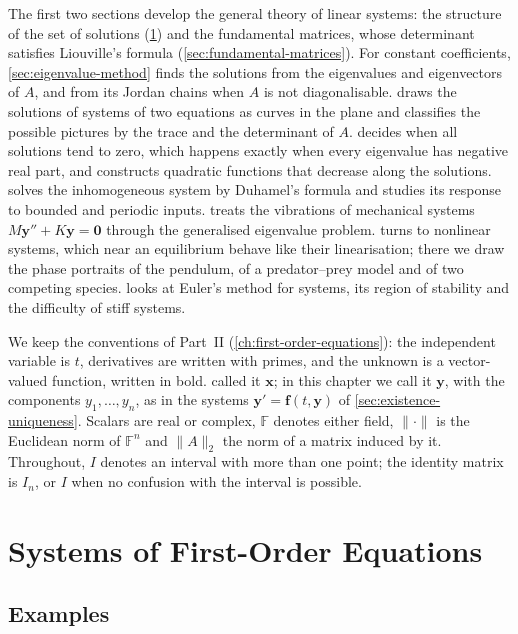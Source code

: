 The first two sections develop the general theory of linear systems: the structure of the set of solutions (\cref{sec:ode-systems}) and the fundamental matrices, whose determinant satisfies Liouville's formula (\cref{sec:fundamental-matrices}). For constant coefficients, \cref{sec:eigenvalue-method} finds the solutions from the eigenvalues and eigenvectors of $A$, and from its Jordan chains when $A$ is not diagonalisable.  draws the solutions of systems of two equations as curves in the plane and classifies the possible pictures by the trace and the determinant of $A$.  decides when all solutions tend to zero, which happens exactly when every eigenvalue has negative real part, and constructs quadratic functions that decrease along the solutions.  solves the inhomogeneous system by Duhamel's formula and studies its response to bounded and periodic inputs.  treats the vibrations of mechanical systems $M\mathbf y''+K\mathbf y=\mathbf 0$ through the generalised eigenvalue problem.  turns to nonlinear systems, which near an equilibrium behave like their linearisation; there we draw the phase portraits of the pendulum, of a predator--prey model and of two competing species.  looks at Euler's method for systems, its region of stability and the difficulty of stiff systems.

We keep the conventions of Part~II (\cref{ch:first-order-equations}): the independent variable is $t$, derivatives are written with primes, and the unknown is a vector-valued function, written in bold.  called it $\mathbf x$; in this chapter we call it $\mathbf y$, with the components $y_1,\ldots,y_n$, as in the systems $\mathbf y'=\mathbf f(t,\mathbf y)$ of \cref{sec:existence-uniqueness}. Scalars are real or complex, $\mathbb F$ denotes either field, $\|\cdot\|$ is the Euclidean norm of $\mathbb F^n$ and $\|A\|_2$ the norm of a matrix induced by it. Throughout, $I$ denotes an interval with more than one point; the identity matrix is $I_n$, or $I$ when no confusion with the interval is possible.

\section{Systems of First-Order Equations}
\label{sec:ode-systems}

\subsection{Examples}

